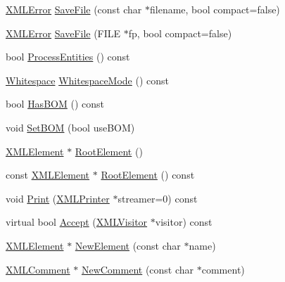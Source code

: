 \begin{DoxyCompactItemize}
\mbox{\hyperlink{namespacetinyxml2_a1fbf88509c3ac88c09117b1947414e08}{X\+M\+L\+Error}} \mbox{\hyperlink{classtinyxml2_1_1_x_m_l_document_a73ac416b4a2aa0952e841220eb3da18f}{Save\+File}} (const char $\ast$filename, bool compact=false)
\item 
\mbox{\hyperlink{namespacetinyxml2_a1fbf88509c3ac88c09117b1947414e08}{X\+M\+L\+Error}} \mbox{\hyperlink{classtinyxml2_1_1_x_m_l_document_a8b95779479a0035acc67b3a61dfe1b74}{Save\+File}} (F\+I\+LE $\ast$fp, bool compact=false)
\item 
bool \mbox{\hyperlink{classtinyxml2_1_1_x_m_l_document_a53e6c035b1b539563fef8c817fb30469}{Process\+Entities}} () const
\item 
\mbox{\hyperlink{namespacetinyxml2_a7f91d00f77360f850fd5da0861e27dd5}{Whitespace}} \mbox{\hyperlink{classtinyxml2_1_1_x_m_l_document_a810ce508e6e0365497c2a9deb83c9ca7}{Whitespace\+Mode}} () const
\item 
bool \mbox{\hyperlink{classtinyxml2_1_1_x_m_l_document_a33fc5d159db873a179fa26338adb05bd}{Has\+B\+OM}} () const
\item 
void \mbox{\hyperlink{classtinyxml2_1_1_x_m_l_document_a14419b698f7c4b140df4e80f3f0c93b0}{Set\+B\+OM}} (bool use\+B\+OM)
\item 
\mbox{\hyperlink{classtinyxml2_1_1_x_m_l_element}{X\+M\+L\+Element}} $\ast$ \mbox{\hyperlink{classtinyxml2_1_1_x_m_l_document_ad2b70320d3c2a071c2f36928edff3e1c}{Root\+Element}} ()
\item 
const \mbox{\hyperlink{classtinyxml2_1_1_x_m_l_element}{X\+M\+L\+Element}} $\ast$ \mbox{\hyperlink{classtinyxml2_1_1_x_m_l_document_a2be8ef9d6346bdef34311f91529afae4}{Root\+Element}} () const
\item 
void \mbox{\hyperlink{classtinyxml2_1_1_x_m_l_document_a867cf5fa3e3ff6ae4847a8b7ee8ec083}{Print}} (\mbox{\hyperlink{classtinyxml2_1_1_x_m_l_printer}{X\+M\+L\+Printer}} $\ast$streamer=0) const
\item 
virtual bool \mbox{\hyperlink{classtinyxml2_1_1_x_m_l_document_ab7be651917a35ab1ff0e4e6d4e565cdf}{Accept}} (\mbox{\hyperlink{classtinyxml2_1_1_x_m_l_visitor}{X\+M\+L\+Visitor}} $\ast$visitor) const
\item 
\mbox{\hyperlink{classtinyxml2_1_1_x_m_l_element}{X\+M\+L\+Element}} $\ast$ \mbox{\hyperlink{classtinyxml2_1_1_x_m_l_document_a3c335a700a43d7c363a393142a23f234}{New\+Element}} (const char $\ast$name)
\item 
\mbox{\hyperlink{classtinyxml2_1_1_x_m_l_comment}{X\+M\+L\+Comment}} $\ast$ \mbox{\hyperlink{classtinyxml2_1_1_x_m_l_document_a386df0befd06aadb5e0cd21381aa955a}{New\+Comment}} (const char $\ast$comment)

\end{DoxyCompactItemize}
